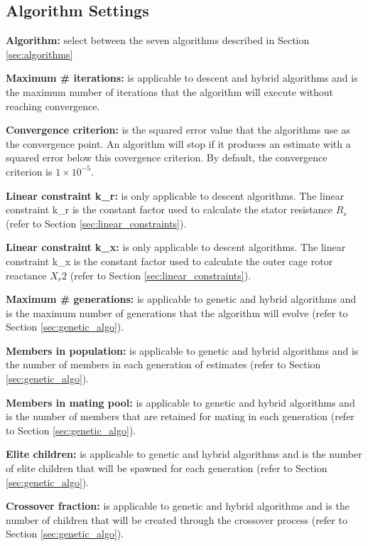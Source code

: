 \documentclass{article}
\begin{document}
\subsection{Algorithm Settings}

\textbf{Algorithm:} select between the seven algorithms described in Section \ref{sec:algorithms}

\textbf{Maximum \# iterations:} is applicable to descent and hybrid algorithms and is the maximum number of iterations that the algorithm will execute without reaching convergence.

\textbf{Convergence criterion:} is the squared error value that the algorithms use as the convergence point. An algorithm will stop if it produces an estimate with a squared error below this covergence criterion. By default, the convergence criterion is $1 \times 10^{-5}$.

\textbf{Linear constraint k\_r:} is only applicable to descent algorithms. The linear constraint k\_r is the constant factor used to calculate the stator resistance $R_s$ (refer to Section \ref{sec:linear_constraints}).

\textbf{Linear constraint k\_x:} is only applicable to descent algorithms. The linear constraint k\_x is the constant factor used to calculate the outer cage rotor reactance $X_r2$ (refer to Section \ref{sec:linear_constraints}).

\textbf{Maximum \# generations:} is applicable to genetic and hybrid algorithms and is the maximum number of generations that the algorithm will evolve (refer to Section \ref{sec:genetic_algo}).

\textbf{Members in population:} is applicable to genetic and hybrid algorithms and is the number of members in each generation of estimates (refer to Section \ref{sec:genetic_algo}).

\textbf{Members in mating pool:} is applicable to genetic and hybrid algorithms and is the number of members that are retained for mating in each generation (refer to Section \ref{sec:genetic_algo}).

\textbf{Elite children:} is applicable to genetic and hybrid algorithms and is the number of elite children that will be spawned for each generation (refer to Section \ref{sec:genetic_algo}).

\textbf{Crossover fraction:} is applicable to genetic and hybrid algorithms and is the number of children that will be created through the crossover process (refer to Section \ref{sec:genetic_algo}).
\end{document}
